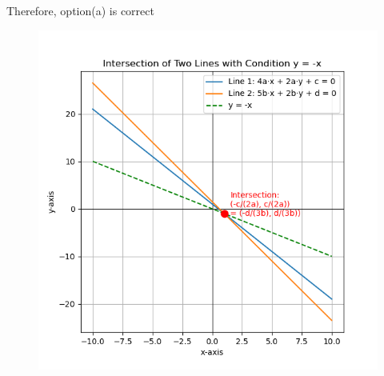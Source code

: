 \documentclass[journal,12pt,onecolumn]{IEEEtran}
\begin{document}
Therefore, option(a) is correct
\begin{figure}[h!]
    \centering
    \includegraphics[height=0.5\textheight, keepaspectratio]{figs/fig.png}
    \label{figure_1}
\end{figure}
\end{document}
